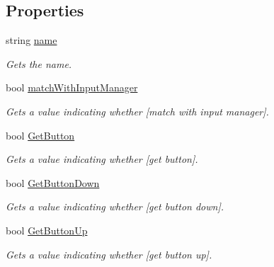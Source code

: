 \subsection*{Properties}
\begin{DoxyCompactItemize}
\item 
string \hyperlink{class_lerp2_assets_1_1_cross_platform_input_1_1_cross_platform_input_manager_1_1_virtual_button_a0266afd92246760f8d922f131467bc14}{name}
\begin{DoxyCompactList}\small\item\em Gets the name. \end{DoxyCompactList}\item 
bool \hyperlink{class_lerp2_assets_1_1_cross_platform_input_1_1_cross_platform_input_manager_1_1_virtual_button_af0f52c848da159cd19aa84bd1d1370ee}{match\+With\+Input\+Manager}
\begin{DoxyCompactList}\small\item\em Gets a value indicating whether \mbox{[}match with input manager\mbox{]}. \end{DoxyCompactList}\item 
bool \hyperlink{class_lerp2_assets_1_1_cross_platform_input_1_1_cross_platform_input_manager_1_1_virtual_button_a8ae284ef0c2c986daff64b9c58bb4a76}{Get\+Button}
\begin{DoxyCompactList}\small\item\em Gets a value indicating whether \mbox{[}get button\mbox{]}. \end{DoxyCompactList}\item 
bool \hyperlink{class_lerp2_assets_1_1_cross_platform_input_1_1_cross_platform_input_manager_1_1_virtual_button_a5b261fccb7a75fdf6f0353b381184d9f}{Get\+Button\+Down}
\begin{DoxyCompactList}\small\item\em Gets a value indicating whether \mbox{[}get button down\mbox{]}. \end{DoxyCompactList}\item 
bool \hyperlink{class_lerp2_assets_1_1_cross_platform_input_1_1_cross_platform_input_manager_1_1_virtual_button_a3827b16a93fd8780d788f4a3f129f524}{Get\+Button\+Up}
\begin{DoxyCompactList}\small\item\em Gets a value indicating whether \mbox{[}get button up\mbox{]}. \end{DoxyCompactList}\end{DoxyCompactItemize}


